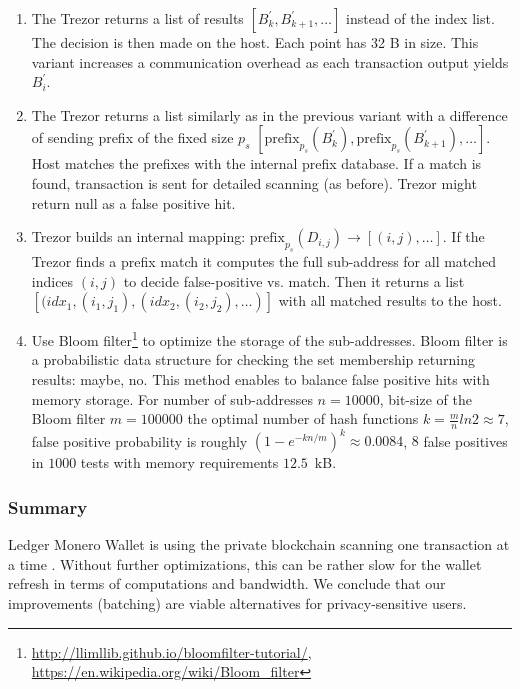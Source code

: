 \documentclass[]{article}
\begin{document}
\begin{enumerate}
	\item The Trezor returns a list of results $\left[B^{\prime}_k, B^{\prime}_{k+1}, \dots\right]$ instead of the index list. The decision is then made on the host. Each point has 32 B in size. This variant increases a communication overhead as each transaction output yields $B^{\prime}_i$.
	
	\item The Trezor returns a list similarly as in the previous variant with a difference of sending prefix of the fixed size $p_s$
	$\left[\text{prefix}_{p_s}\left(B^{\prime}_k\right), \text{prefix}_{p_s}\left(B^{\prime}_{k+1}\right), \dots\right]$. Host matches the prefixes with the internal prefix database. If a match is found, transaction is sent for detailed scanning (as before). Trezor might return null as a false positive hit.
	
	\item Trezor builds an internal mapping: $\text{prefix}_{p_s}\left(D_{i,j}\right) \rightarrow \left[(i, j), \dots\right]$.
	If the Trezor finds a prefix match it computes the full sub-address for all matched indices $(i,j)$ to decide false-positive vs. match. Then it returns a list $\left[(idx_1, (i_1, j_1), (idx_2, (i_2, j_2), \dots)\right]$ with all matched results to the host. 
	
	\item Use Bloom filter\footnote{ \url{http://llimllib.github.io/bloomfilter-tutorial/}, \url{https://en.wikipedia.org/wiki/Bloom_filter}} to optimize the storage of the sub-addresses. Bloom filter is a probabilistic data structure for checking the set membership returning results: maybe, no.
	This method enables to balance false positive hits with memory storage. For number of sub-addresses $n=10000$, bit-size of the Bloom filter $m=100000$ the optimal number of hash functions $k=\frac{m}{n}ln2 \approx 7$, false positive probability is roughly $\left(1-e^{-kn/m}\right)^k \approx 0.0084$, $8$ false positives in $1000$ tests with memory requirements $12.5$~kB.
	
\end{enumerate}

\subsubsection{Summary}
Ledger Monero Wallet is using the private blockchain scanning one transaction at a time \cite{ledger_doc}. Without further optimizations, this can be rather slow for the wallet refresh in terms of computations and bandwidth.
We conclude that our improvements (batching) are viable alternatives for privacy-sensitive users.
\end{document}
